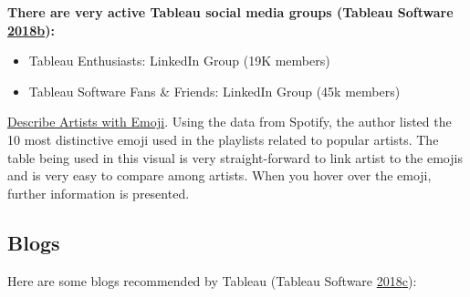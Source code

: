 \documentclass[]{book}
\providecommand{\tightlist}{%
  \setlength{\itemsep}{0pt}\setlength{\parskip}{0pt}}
\theoremstyle{definition}
\theoremstyle{definition}
\theoremstyle{definition}
\theoremstyle{remark}
\begin{document}
\textbf{There are very active Tableau social media groups (Tableau
Software
\protect\hyperlink{ref-LinkedIn_Groups}{2018}\protect\hyperlink{ref-LinkedIn_Groups}{b}):}

\begin{itemize}
\tightlist
\item
  Tableau Enthusiasts: LinkedIn Group (19K members)
\item
  Tableau Software Fans \& Friends: LinkedIn Group (45k members)
\end{itemize}

\href{https://public.tableau.com/en-us/s/gallery/what-emoji-say-about-music?gallery=featured}{Describe
Artists with Emoji}. Using the data from Spotify, the author listed the
10 most distinctive emoji used in the playlists related to popular
artists. The table being used in this visual is very straight-forward to
link artist to the emojis and is very easy to compare among artists.
When you hover over the emoji, further information is presented.

\subsection{Blogs}\label{blogs-1}

Here are some blogs recommended by Tableau (Tableau Software
\protect\hyperlink{ref-Top_10_Blogs}{2018}\protect\hyperlink{ref-Top_10_Blogs}{c}):
\end{document}
